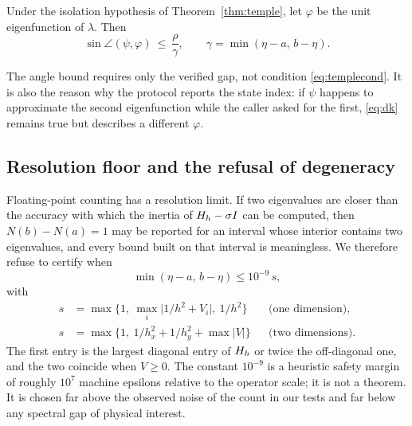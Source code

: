 \begin{theorem}
\label{thm:dk}
Under the isolation hypothesis of Theorem~\ref{thm:temple}, let $\varphi$ be
the unit eigenfunction of $\lambda$. Then
\begin{equation}
  \sin\angle(\psi,\varphi)\ \le\ \frac{\rho}{\gamma},
  \qquad \gamma=\min(\eta-a,\,b-\eta).
  \label{eq:dk}
\end{equation}
\end{theorem}

The angle bound requires only the verified gap, not condition
\eqref{eq:templecond}. It is also the reason why the protocol reports the
state index: if $\psi$ happens to approximate the second eigenfunction while
the caller asked for the first, \eqref{eq:dk} remains true but describes a
different $\varphi$.

\subsection{Resolution floor and the refusal of degeneracy}
\label{sec:floor}

Floating-point counting has a resolution limit. If two eigenvalues are closer
than the accuracy with which the inertia of $H_h-\sigma I$ can be computed,
then $N(b)-N(a)=1$ may be reported for an interval whose interior contains two
eigenvalues, and every bound built on that interval is meaningless. We
therefore refuse to certify when
\begin{equation}
  \min(\eta-a,\,b-\eta) \le 10^{-9}\,s,
  \label{eq:floor}
\end{equation}
with
\begin{equation}
  \begin{aligned}
  s &= \max\big\{1,\ \max_i\lvert 1/h^2+V_i\rvert,\ 1/h^2\big\}
    &&\text{(one dimension)},\\
  s &= \max\big\{1,\ 1/h_x^2+1/h_y^2+\max\lvert V\rvert\big\}
    &&\text{(two dimensions)}.
  \end{aligned}
\end{equation}
The first entry is the largest diagonal entry of $H_h$ or twice the
off-diagonal one, and the two coincide when $V\ge0$.
The constant $10^{-9}$ is a heuristic safety margin of roughly $10^{7}$
machine epsilons relative to the operator scale; it is not a theorem. It is
chosen far above the observed noise of the count in our tests and far below
any spectral gap of physical interest.

